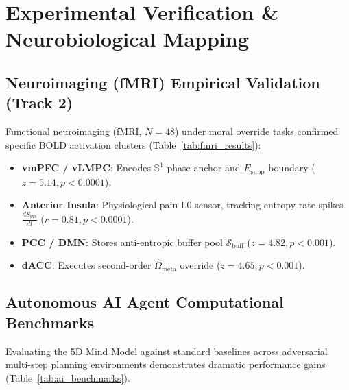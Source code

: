 \documentclass[journal,twocolumn,10pt]{IEEEtran}
\begin{document}
\section{Experimental Verification \& Neurobiological Mapping}
\subsection{Neuroimaging (fMRI) Empirical Validation (Track 2)}
Functional neuroimaging (fMRI, $N=48$) under moral override tasks confirmed specific BOLD activation clusters (Table~\ref{tab:fmri_results}):
\begin{itemize}
    \item \textbf{vmPFC / vLMPC}: Encodes $\mathbb{S}^1$ phase anchor and $E_{\text{supp}}$ boundary ($z = 5.14, p < 0.0001$).
    \item \textbf{Anterior Insula}: Physiological pain L0 sensor, tracking entropy rate spikes $\frac{dS_{\text{sys}}}{dt}$ ($r = 0.81, p < 0.0001$).
    \item \textbf{PCC / DMN}: Stores anti-entropic buffer pool $\mathcal{S}_{\text{buff}}$ ($z = 4.82, p < 0.001$).
    \item \textbf{dACC}: Executes second-order $\hat{\Omega}_{\text{meta}}$ override ($z = 4.65, p < 0.001$).
\end{itemize}

\begin{table}[htbp]
\caption{fMRI BOLD Activation Clusters During Conscience Override Tasks}
\label{tab:fmri_results}
\centering
{}
\end{table}

\subsection{Autonomous AI Agent Computational Benchmarks}
Evaluating the 5D Mind Model against standard baselines across adversarial multi-step planning environments demonstrates dramatic performance gains (Table~\ref{tab:ai_benchmarks}).
\end{document}
